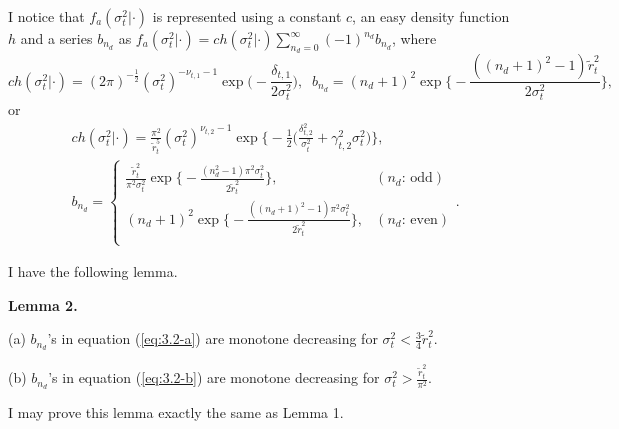 \documentclass[11pt]{article}
\begin{document}
I notice that $f_a(\sigma^2_t|\cdot)$ is represented using a constant $c$, an easy density function $h$ and a series $b_{n_d}$ as $f_a(\sigma^2_t|\cdot)=ch(\sigma^2_t|\cdot)\sum_{n_d=0}^\infty (-1)^{n_d} b_{n_d}$, where 
\begin{equation} \label{eq:3.2-a}
ch(\sigma^2_t|\cdot) =(2\pi)^{-\frac{1}{2}} (\sigma^2_t)^{-\nu_{t,1}-1} \exp\Big(-\frac{\delta_{t,1}}{2\sigma^2_t} \Big), \;\; 
b_{n_d} =(n_d+1)^2 \exp\bigg\{ -\frac{((n_d+1)^2-1)\widetilde{r}_t^2}{2\sigma_t^2} \bigg\}, 
\end{equation}
or 
\begin{align}
&ch(\sigma^2_t|\cdot) = \frac{\pi^2}{\widetilde{r}_t^5} 
(\sigma^2_t)^{\nu_{t,2}-1} \exp\bigg\{ -\frac{1}{2}\Big(\frac{\delta_{t,2}^2}{\sigma^2_t} +\gamma_{t, 2}^2\sigma^2_t \Big)\bigg\},  \label{eq:3.2-b} \\
&b_{n_d} =
\begin{cases}
\frac{\widetilde{r}_t^2}{\pi^2\sigma_t^{2}} \exp\bigg\{ -\frac{(n_d^2-1)\pi^2\sigma_t^2}{2\widetilde{r}_t^2} \bigg\}, & (n_d\text{: odd}) \\
(n_d+1)^2 \exp\bigg\{ -\frac{((n_d+1)^2-1)\pi^2\sigma_t^2}{2\widetilde{r}_t^2} \bigg\}, & (n_d\text{: even}) \\
\end{cases}.
\end{align}

I have the following lemma.

\vspace{\baselineskip}

\noindent
{\bf Lemma 2.} 

(a) $b_{n_d}$'s in equation (\ref{eq:3.2-a}) are monotone decreasing for $\sigma^2_t<\frac{3}{4}\widetilde{r}_t^2$.

(b) $b_{n_d}$'s in equation (\ref{eq:3.2-b}) are monotone decreasing for $\sigma^2_t>\frac{\widetilde{r}_t^2}{\pi^2}$.

\vspace{\baselineskip}

I may prove this lemma exactly the same as Lemma 1.
\end{document}
